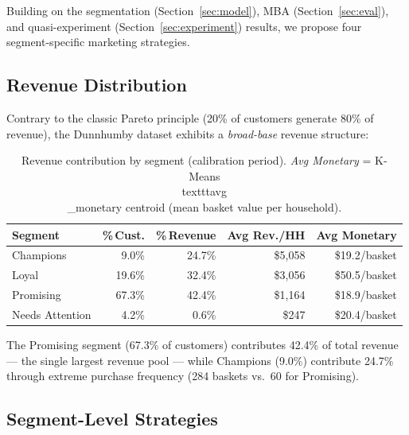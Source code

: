 \documentclass[conference]{IEEEtran}
\begin{document}
Building on the segmentation (Section~\ref{sec:model}),
MBA (Section~\ref{sec:eval}), and quasi-experiment
(Section~\ref{sec:experiment}) results, we propose four
segment-specific marketing strategies.

\subsection{Revenue Distribution}

Contrary to the classic Pareto principle (20\% of customers
generate 80\% of revenue), the Dunnhumby dataset exhibits a
\emph{broad-base} revenue structure:

\begin{table}[H]
\centering
\caption{Revenue contribution by segment (calibration period).
         \textit{Avg Monetary} = K-Means \\texttt{avg\\_monetary} centroid
         (mean basket value per household).}
\label{tab:revenue}
\begin{tabular}{lrrrr}
\toprule
\textbf{Segment} & \textbf{\%\,Cust.} & \textbf{\%\,Revenue}
  & \textbf{Avg Rev./HH} & \textbf{Avg Monetary} \\
\midrule
Champions       &  9.0\% & 24.7\% & \$5{,}058 & \$19.2/basket \\
Loyal           & 19.6\% & 32.4\% & \$3{,}056 & \$50.5/basket \\
Promising       & 67.3\% & 42.4\% & \$1{,}164 & \$18.9/basket \\
Needs Attention &  4.2\% &  0.6\% &    \$247 & \$20.4/basket \\
\bottomrule
\end{tabular}
\end{table}


The Promising segment (67.3\% of customers) contributes 42.4\% of
total revenue --- the single largest revenue pool --- while Champions
(9.0\%) contribute 24.7\% through extreme purchase frequency
(284 baskets vs.\ 60 for Promising).

\subsection{Segment-Level Strategies}
\end{document}
